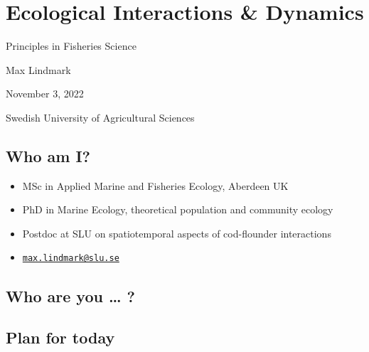 \documentclass[
  letterpaper,
  DIV=11,
  numbers=noendperiod]{scrartcl}
\author{}
\date{}
\renewcommand*\contentsname{Table of contents}
\newcommand\contentsname{Table of contents}
\begin{document}
\ifdefined\Shaded\renewenvironment{Shaded}{\begin{tcolorbox}[enhanced, sharp corners, frame hidden, boxrule=0pt, interior hidden, breakable, borderline west={3pt}{0pt}{shadecolor}]}{\end{tcolorbox}}\fi

\renewcommand*\contentsname{Table of contents}
{
\hypersetup{linkcolor=}
\setcounter{tocdepth}{3}
\tableofcontents
}
\hypertarget{ecological-interactions-dynamics}{%
\section{Ecological Interactions \&
Dynamics}\label{ecological-interactions-dynamics}}

Principles in Fisheries Science

Max Lindmark

November 3, 2022

Swedish University of Agricultural Sciences

\hypertarget{who-am-i}{%
\subsection{Who am I?}\label{who-am-i}}

\begin{itemize}
\item
  MSc in Applied Marine and Fisheries Ecology, Aberdeen UK
\item
  PhD in Marine Ecology, theoretical population and community ecology
\item
  Postdoc at SLU on spatiotemporal aspects of cod-flounder interactions
\item
  \href{mailto:max.lindmark@slu.se}{\nolinkurl{max.lindmark@slu.se}}
\end{itemize}

\hypertarget{who-are-you}{%
\subsection{Who are you \ldots{} ?}\label{who-are-you}}

\hypertarget{plan-for-today}{%
\subsection{Plan for today}\label{plan-for-today}}
\end{document}
